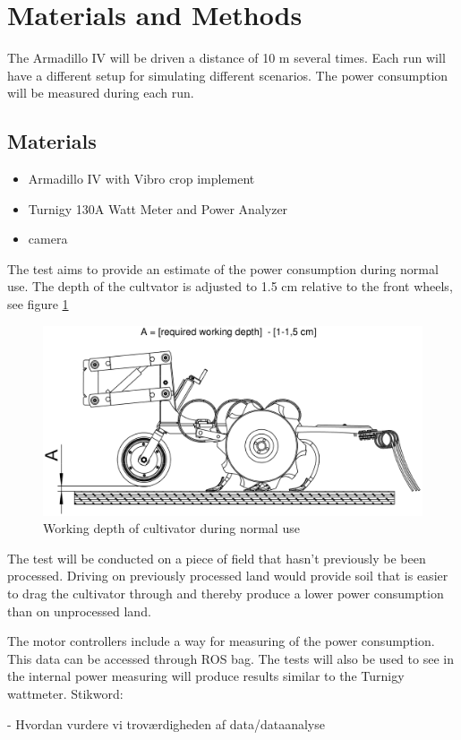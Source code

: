 \section{Materials and Methods}
The Armadillo IV will be driven a distance of 10 m several times. Each run will have a different setup for simulating different scenarios. The power consumption will be measured during each run.  

\subsection{Materials}\label{Materials}
\begin{itemize}
	\item Armadillo IV with Vibro crop implement
	\item Turnigy 130A Watt Meter and Power Analyzer
	\item camera
\end{itemize}
The test aims to provide an estimate of the power consumption during normal use. The depth of the cultvator is adjusted to 1.5 cm relative to the front wheels, see figure \ref{fig:vibro_crop_working_depth}
\begin{figure}[hbtp]
	\centering
	\includegraphics[width=0.7\linewidth]{./images/vibro_crop_working_depth}
	\caption{Working depth of cultivator during normal use}
	\label{fig:vibro_crop_working_depth}
\end{figure}
 
The test will be conducted on a piece of field that hasn't previously be been processed. Driving on previously processed land would provide soil that is easier to drag the cultivator through and thereby produce a lower power consumption than on unprocessed land. 

The motor controllers include a way for measuring of the power consumption. This data can be accessed through ROS bag. The tests will also be used to see in the internal power measuring will produce results similar to the Turnigy wattmeter.
Stikword:

	- Hvordan vurdere vi troværdigheden af data/dataanalyse
